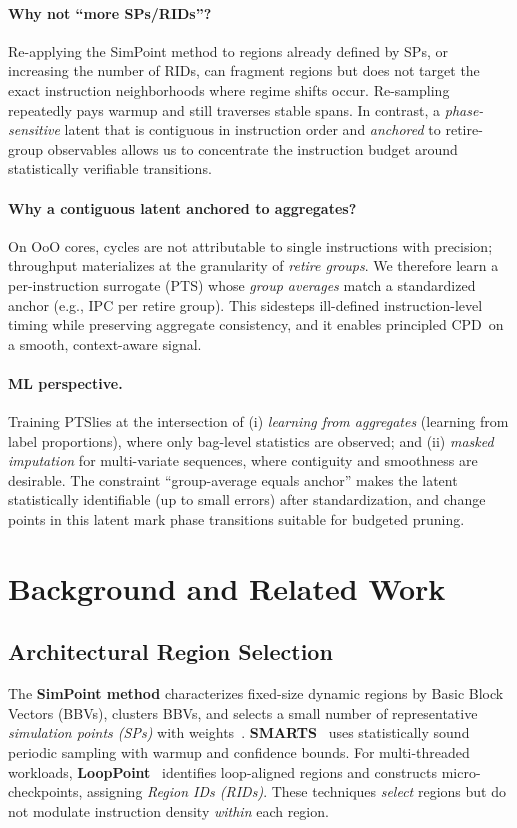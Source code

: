 \documentclass[10pt,journal,compsoc]{IEEEtran}
\newcommand{\pts}{\textsc{PTS}}
\newcommand{\cpd}{\textsc{CPD}}
\begin{document}
\paragraph{Why not “more SPs/RIDs”?}
Re-applying the SimPoint method to regions already defined by SPs, or increasing the number of RIDs, can fragment regions but does not target the exact instruction neighborhoods where regime shifts occur. Re-sampling repeatedly pays warmup and still traverses stable spans. In contrast, a \emph{phase-sensitive} latent that is contiguous in instruction order and \emph{anchored} to retire-group observables allows us to concentrate the instruction budget around statistically verifiable transitions.
\paragraph{Why a contiguous latent anchored to aggregates?}
On OoO cores, cycles are not attributable to single instructions with precision; throughput materializes at the granularity of \emph{retire groups}. We therefore learn a per-instruction surrogate (\pts) whose \emph{group averages} match a standardized anchor (e.g., IPC per retire group). This sidesteps ill-defined instruction-level timing while preserving aggregate consistency, and it enables principled \cpd\ on a smooth, context-aware signal.
\paragraph{ML perspective.}
Training \pts lies at the intersection of (i) \emph{learning from aggregates} (learning from label proportions), where only bag-level statistics are observed; and (ii) \emph{masked imputation} for multi-variate sequences, where contiguity and smoothness are desirable. The constraint “group-average equals anchor” makes the latent statistically identifiable (up to small errors) after standardization, and change points in this latent mark phase transitions suitable for budgeted pruning.
\section{Background and Related Work}
\label{sec:background}
\subsection{Architectural Region Selection}
The \textbf{SimPoint method} characterizes fixed-size dynamic regions by Basic Block Vectors (BBVs), clusters BBVs, and selects a small number of representative \emph{simulation points (SPs)} with weights~\cite{simpoint-asplos02,simpoint03,simpoint-howto}. \textbf{SMARTS}~\cite{smarts-isca03} uses statistically sound periodic sampling with warmup and confidence bounds. For multi-threaded workloads, \textbf{LoopPoint}~\cite{looppoint-hpca22} identifies loop-aligned regions and constructs micro-checkpoints, assigning \emph{Region IDs (RIDs)}. These techniques \emph{select} regions but do not modulate instruction density \emph{within} each region.
\end{document}
